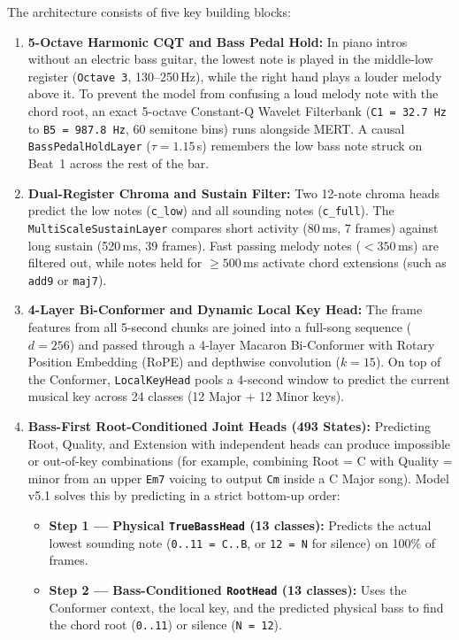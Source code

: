 \documentclass[a4paper]{article}
\begin{document}
The architecture consists of five key building blocks:

\begin{enumerate}
    \item \textbf{5-Octave Harmonic CQT and Bass Pedal Hold:} In piano intros without an electric bass guitar, the lowest note is played in the middle-low register (\texttt{Octave 3}, 130--250\,Hz), while the right hand plays a louder melody above it. To prevent the model from confusing a loud melody note with the chord root, an exact 5-octave Constant-Q Wavelet Filterbank (\texttt{C1 = 32.7\,Hz} to \texttt{B5 = 987.8\,Hz}, 60 semitone bins) runs alongside MERT. A causal \texttt{BassPedalHoldLayer} ($\tau = 1.15$\,s) remembers the low bass note struck on Beat~1 across the rest of the bar.
    \item \textbf{Dual-Register Chroma and Sustain Filter:} Two 12-note chroma heads predict the low notes (\texttt{c\_low}) and all sounding notes (\texttt{c\_full}). The \texttt{MultiScaleSustainLayer} compares short activity (80\,ms, 7 frames) against long sustain (520\,ms, 39 frames). Fast passing melody notes ($<350$\,ms) are filtered out, while notes held for $\ge 500$\,ms activate chord extensions (such as \texttt{add9} or \texttt{maj7}).
    \item \textbf{4-Layer Bi-Conformer and Dynamic Local Key Head:} The frame features from all 5-second chunks are joined into a full-song sequence ($d=256$) and passed through a 4-layer Macaron Bi-Conformer with Rotary Position Embedding (RoPE) and depthwise convolution ($k=15$). On top of the Conformer, \texttt{LocalKeyHead} pools a 4-second window to predict the current musical key across 24 classes (12 Major + 12 Minor keys).
    \item \textbf{Bass-First Root-Conditioned Joint Heads (493 States):} Predicting Root, Quality, and Extension with independent heads can produce impossible or out-of-key combinations (for example, combining Root = C with Quality = minor from an upper \texttt{Em7} voicing to output \texttt{Cm} inside a C Major song). Model v5.1 solves this by predicting in a strict bottom-up order:
    \begin{itemize}
        \item \textbf{Step 1 --- Physical \texttt{TrueBassHead} (13 classes):} Predicts the actual lowest sounding note (\texttt{0..11 = C..B}, or \texttt{12 = N} for silence) on 100\% of frames.
        \item \textbf{Step 2 --- Bass-Conditioned \texttt{RootHead} (13 classes):} Uses the Conformer context, the local key, and the predicted physical bass to find the chord root (\texttt{0..11}) or silence (\texttt{N = 12}).

\end{itemize}
\end{enumerate}
\end{document}
